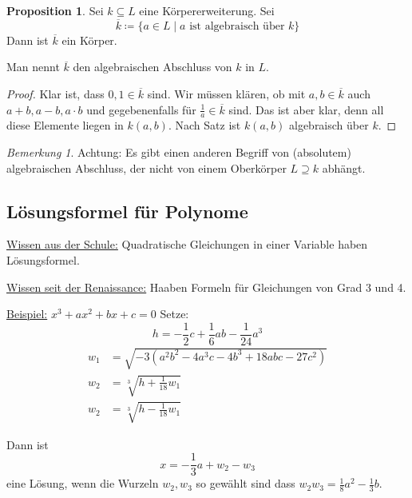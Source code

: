 \documentclass[12pt,parskip=full]{scrartcl}
\newcommand{\heading}{\underline}
\theoremstyle{definition}
\newtheorem{proposition}[theorem]{Proposition}
\theoremstyle{remark}
\newtheorem*{remark}{Bemerkung}
\begin{document}
	\begin{proposition}
		Sei $k \subseteq L$ eine Körpererweiterung. Sei
		\begin{equation*}
			\overline{k} \coloneqq \{ a \in L \mid a \text{ ist algebraisch über } k \}
		\end{equation*}
		Dann ist $\overline{k}$ ein Körper.
		
		Man nennt $\overline{k}$ den algebraischen Abschluss von $k$ in $L$.
	\end{proposition}

	\begin{proof}
		Klar ist, dass $0,1 \in \overline{k}$ sind. Wir müssen klären, ob mit $a,b \in \overline{k}$ auch $a+b, a-b, a \cdot b$ und gegebenenfalls für $\frac{1}{a} \in \overline{k}$ sind. Das ist aber klar, denn all diese Elemente liegen in $k(a,b)$. Nach Satz ist $k(a,b)$ algebraisch über $k$.
	\end{proof}

	\begin{remark}
		Achtung: Es gibt einen anderen Begriff von (absolutem) algebraischen Abschluss, der nicht von einem Oberkörper $L \supseteq k$ abhängt.
	\end{remark}

	\subsection{Lösungsformel für Polynome}
	
	\heading{Wissen aus der Schule:} Quadratische Gleichungen in einer Variable haben Lösungsformel.
	
	\heading{Wissen seit der Renaissance:} Haaben Formeln für Gleichungen von Grad 3 und 4.
	
	\heading{Beispiel:} $x^3 + a x^2 + bx + c = 0$ Setze:
	\begin{equation*}
		h = - \frac12 c + \frac16 a b - \frac{1}{24} a^3
	\end{equation*}
	\begin{align*}
		w_1 &= \sqrt{-3 (a^2 b^2 - 4 a^3c - 4b^3 + 18abc - 27c^2)} \\
		w_2 &= \sqrt[3]{h + \frac{1}{18} w_1} \\
		w_2 &= \sqrt[3]{h - \frac{1}{18} w_1}
	\end{align*}
	
	Dann ist
	\begin{equation*}
		x = - \frac13 a + w_2 - w_3
	\end{equation*}
	eine Lösung, wenn die Wurzeln $w_2, w_3$ so gewählt sind dass $w_2 w_3 = \frac18 a^2 - \frac13 b$.
	
\end{document}

